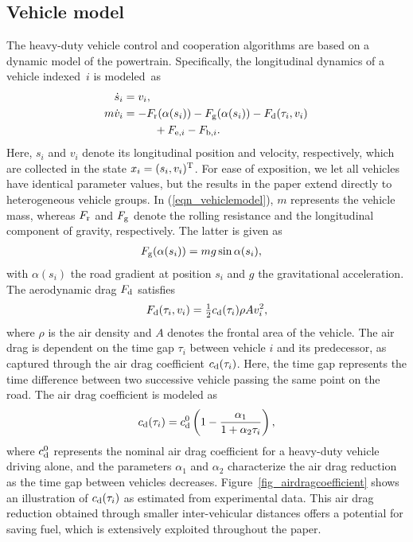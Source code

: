 \documentclass[journal]{IEEEtran}
\newcommand{\dt}{\ensuremath{\tau}}
\begin{document}
\subsection{Vehicle model}\label{sec_vehiclemodel}
The heavy-duty vehicle control and cooperation algorithms are based on a dynamic model of the powertrain. Specifically, the longitudinal dynamics of a vehicle indexed~$i$ is modeled~as
\begin{align}
\begin{split}
\dot{s}_i &= v_i, \\
\!m\dot{v}_i &= -F_{\text{\rm r}}(\alpha(s_i)) - F_{\text{\rm g}}(\alpha(s_i)) - F_{\text{\rm d}}(\dt_i,v_i) \\ &\phantom{=}\qquad + F_{\text{\rm e},i} - F_{\text{\rm b},i}.
\end{split}\label{eqn_vehiclemodel}
\end{align}
Here, $s_i$ and $v_i$ denote its longitudinal position and velocity, respectively, which are collected in the state $x_i =(s_i,v_i)^{\mathrm{T}}$. For ease of exposition, we let all vehicles have identical parameter values, but the results in the paper extend directly to heterogeneous vehicle groups. In (\ref{eqn_vehiclemodel}), $m$ represents the vehicle mass, whereas $F_{\text{\rm r}}$ and $F_{\text{\rm g}}$ denote the rolling resistance and the longitudinal component of gravity, respectively. The latter is given as
\begin{align}
F_{\text{\rm g}}(\alpha(s_i)) &= mg\sin\alpha(s_i),
\label{eqn_forces_gravity}
\end{align}
with $\alpha(s_i)$ the road gradient at position $s_i$ and $g$ the gravitational acceleration. The aerodynamic drag $F_{\text{\rm d}}$ satisfies
\begin{align}
F_{\text{\rm d}}(\dt_i,v_i) = \tfrac{1}{2} c_{\text{\rm d}}(\dt_i) \rho A v_i^2,
\label{eqn_forces_airdrag}
\end{align}
where $\rho$ is the air density and $A$ denotes the frontal area of the vehicle. The air drag is dependent on the time gap $\dt_i$ between vehicle $i$ and its predecessor, as captured through the air drag coefficient $c_{\text{\rm d}}(\dt_i)$. Here, the time gap represents the time difference between two successive vehicle passing the same point on the road. The air drag coefficient is modeled as
\begin{align}
c_{\text{\rm d}}(\dt_i) = c_{\text{\rm d}}^0 \left(1 - \frac{\alpha_1}{1 + \alpha_2\dt_i}\right),
\label{eqn_airdragcoefficient}
\end{align}
where $c_{\text{\rm d}}^0$ represents the nominal air drag coefficient for a heavy-duty vehicle driving alone, and the parameters $\alpha_1$ and $\alpha_2$ characterize the air drag reduction as the time gap between vehicles decreases. Figure~\ref{fig_airdragcoefficient} shows an illustration of $c_{\text{\rm d}}(\dt_i)$ as estimated from experimental data. This air drag reduction obtained through smaller inter-vehicular distances offers a potential for saving fuel, which is extensively exploited throughout the paper.
\end{document}
